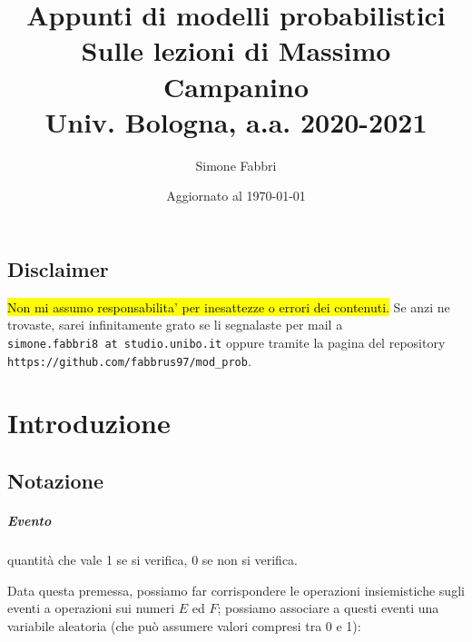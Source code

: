 \documentclass[a4paper,12pt]{book}
\begin{document}
	
\newcommand{\formule}[2]{
	\par\medskip\noindent%
	\begin{tabular*}{\linewidth}{@{}
			>{\centering$\displaystyle}p{\dimexpr0.24\linewidth-2\tabcolsep}<{$} %
			m{\dimexpr0.56\linewidth-2\tabcolsep}
			@{}}
		#1 & #2  
	\end{tabular*}\par\medskip\noindent}


\author{Simone Fabbri}
\title{%
	Appunti di modelli probabilistici \\
	\large Sulle lezioni di Massimo Campanino \\
	Univ. Bologna, a.a. 2020-2021}

\date{Aggiornato al \today}

\frontmatter
\maketitle

\section*{Disclaimer}
\hl{Non mi assumo responsabilita' per inesattezze o errori dei contenuti.} Se anzi ne trovaste, sarei infinitamente grato se li segnalaste per mail a \\ \texttt{simone.fabbri8 at studio.unibo.it} oppure tramite la pagina del repository \texttt{https://github.com/fabbrus97/mod\_prob}. 

\tableofcontents

\mainmatter
%
%
\chapter{Introduzione}
\section{Notazione}
\paragraph{Evento} quantità che vale 1 se si verifica, 0 se non si verifica. 

Data questa premessa, possiamo far corrispondere le operazioni insiemistiche sugli eventi a operazioni sui numeri $ E $ ed $ F $; possiamo associare a questi eventi una variabile aleatoria (che può assumere valori compresi tra 0 e 1):
\end{document}
